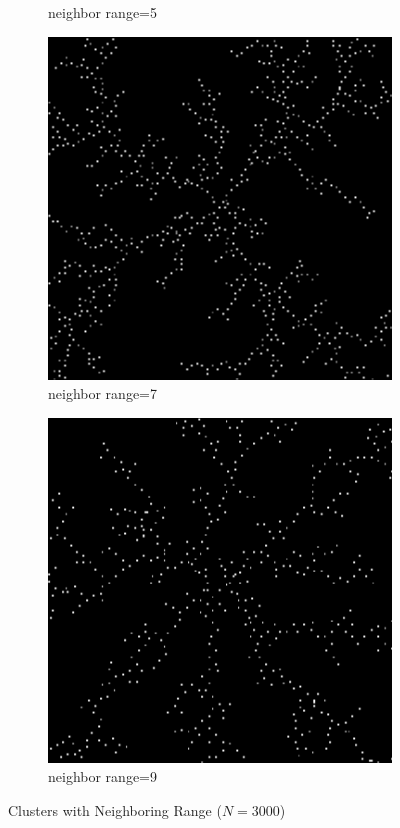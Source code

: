 \documentclass[aps,preprint,groupedaddress,letterpaper]{revtex4-1}
\begin{document}
\begin{figure}[h]
\begin{subfigure}[h]{0.23\textwidth}
         \caption{neighbor range=5}
         \label{nr5}
     \end{subfigure}
     \hfill
     \begin{subfigure}[h]{0.23\textwidth}
         \centering
         \includegraphics[width=\textwidth]{img/Neighbor/7.png}
         \caption{neighbor range=7}
         \label{nr7}
     \end{subfigure}
     \hfill
     \begin{subfigure}[h]{0.23\textwidth}
         \centering
         \includegraphics[width=\textwidth]{img/Neighbor/9.png}
         \caption{neighbor range=9}
         \label{nr9}
     \end{subfigure}
        \caption{Clusters with Neighboring Range ($N=3000$)}
        \label{nrs}
\end{figure}
\end{document}

